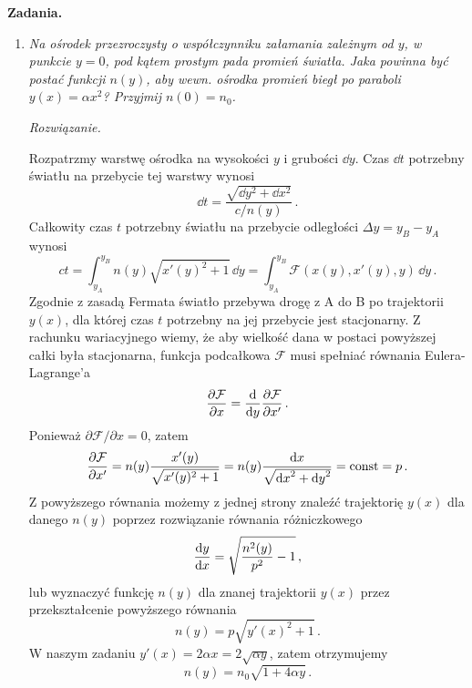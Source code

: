 \documentclass[../main.tex]{subfiles}
\begin{document}
\textbf{Zadania.}
\begin{enumerate}
    \item \textit{Na ośrodek przezroczysty o współczynniku załamania zależnym od \(y\), w punkcie
    \(y=0\), pod kątem prostym pada promień światła. Jaka powinna być postać funkcji \(n(y)\), aby
    wewn. ośrodka promień biegł po paraboli \(y(x)=\alpha x^2\)? Przyjmij \(n(0)=n_0\).}
\medskip

\textit{Rozwiązanie.}
\medskip

Rozpatrzmy warstwę ośrodka na wysokości \(y\) i grubości \(\dd y\). Czas \(\dd t\) potrzebny światłu
na przebycie tej warstwy wynosi
\begin{equation*}
    \dd{t}=\frac{\sqrt{\dd{y}^2+\dd{x}^2}}{c/n(y)}\,.
\end{equation*}
Całkowity czas \(t\) potrzebny światłu na przebycie odległości \(\Delta y=y_B-y_A\) wynosi
\begin{equation*}
    ct=\int_{y_A}^{y_B} n(y)\sqrt{x'(y)^2+1}\,\dd{y}=\int_{y_A}^{y_B} \mathcal{F}(x(y), x'(y), y)\,\dd{y}\,.
\end{equation*}
Zgodnie z zasadą Fermata światło przebywa drogę z A do B po trajektorii \(y(x)\), dla której czas
\(t\) potrzebny na jej przebycie jest stacjonarny. Z rachunku wariacyjnego wiemy, że aby wielkość
dana w postaci powyższej całki była stacjonarna, funkcja podcałkowa \(\mathcal{F}\) musi spełniać
równania Eulera-Lagrange'a
\begin{equation*}
    \pdv{\mathcal{F}}{x}=\dv{}{y}\pdv{\mathcal{F}}{x'}\,.
\end{equation*}
Ponieważ \(\partial\mathcal{F}/\partial x=0\), zatem
\begin{equation*}
\pdv{\mathcal{F}}{x'}=n(y)\frac{x'(y)}{\sqrt{x'(y)^2+1}}=n(y)\frac{\dd{x}}{\sqrt{\dd{x}^2+\dd{y}^2}}=\text{const}=p\,.
\end{equation*}
 Z powyższego równania możemy z jednej strony znaleźć trajektorię \(y(x)\) dla danego \(n(y)\)
 poprzez rozwiązanie równania różniczkowego
\begin{equation*}
    \dv{y}{x}=\sqrt{\frac{n^2(y)}{p^2}-1}\,,
\end{equation*}
lub wyznaczyć funkcję \(n(y)\) dla znanej trajektorii \(y(x)\) przez przekształcenie powyższego
równania
\begin{equation*}
    n(y)=p\sqrt{y'(x)^2+1}\,.
\end{equation*}
W naszym zadaniu \(y'(x)=2\alpha x=2\sqrt{\alpha y}\), zatem otrzymujemy
\begin{equation*}
    n(y)=n_0\sqrt{1+4\alpha y}\,.
\end{equation*}

\end{enumerate}
\end{document}
